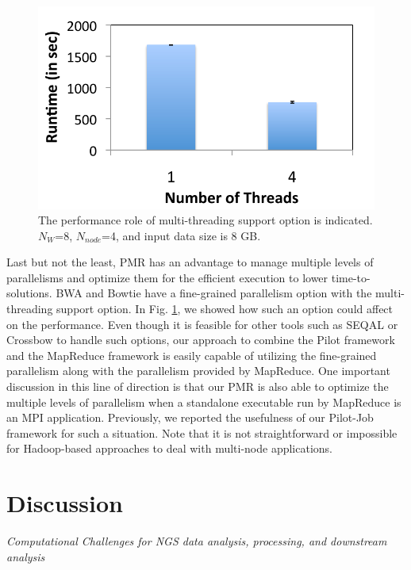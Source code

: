 \documentclass{acm_proc_article-sp}
\begin{document}
\begin{figure} 
 \centering
\includegraphics[scale=0.50]{figures/8GB_4nodes_8w_threadcomp.pdf}
\caption{\small  The performance role of multi-threading support option is indicated.  $N_W$=8, $N_{node}$=4, and input data size is 8 GB.}
  \label{fig:mulit-parallel} 
\end{figure}

Last but not the least, PMR has an advantage to manage multiple levels of parallelisms and optimize them for the efficient execution to lower time-to-solutions.  BWA and Bowtie have a fine-grained parallelism option with the multi-threading support option.   In Fig. \ref{fig:mulit-parallel}, we showed how such an option could affect on the performance.  
Even though it is feasible for other tools such as SEQAL or Crossbow to handle such options, our approach to combine the Pilot framework and the MapReduce framework is easily capable of utilizing the fine-grained parallelism along with the parallelism provided by MapReduce.  One important discussion in this line of direction is that our PMR is also able to optimize the multiple levels of parallelism when a standalone executable run by MapReduce is an MPI application.  Previously, we reported the usefulness of our Pilot-Job framework for such a situation\cite{repex_ptrsa}.  Note that it is not straightforward or impossible for Hadoop-based approaches to deal with multi-node applications.


\section{Discussion}\label{sec:discussions}
\textit{Computational Challenges for NGS data analysis, processing, and downstream analysis}
\end{document}
